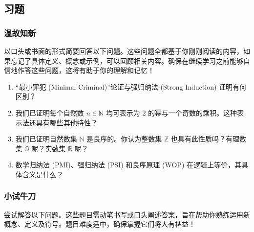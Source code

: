 \subsection{习题}

\subsubsection*{温故知新}

以口头或书面的形式简要回答以下问题。这些问题全都基于你刚刚阅读的内容，如果忘记了具体定义、概念或示例，可以回顾相关内容。确保在继续学习之前能够自信地作答这些问题，这将有助于你的理解和记忆！

\begin{enumerate}[label=(\arabic*)]
    \item ``最小罪犯 (Minimal Criminal)''论证与强归纳法 (Strong Induction) 证明有何区别？
    \item 我们已证明每个自然数 $n \in \mathbb{N}$ 均可表示为 $2$ 的幂与一个奇数的乘积。这种表示法还具有哪些其他特性？
    \item 我们已证明自然数集 $\mathbb{N}$ 是良序的。你认为整数集 $\mathbb{Z}$ 也具有此性质吗？有理数集 $\mathbb{Q}$ 呢？实数集 $\mathbb{R}$ 呢？
    \item 数学归纳法 (PMI)、强归纳法 (PSI) 和良序原理 (WOP) 在逻辑上等价，其具体含义是什么？
\end{enumerate}

\subsubsection*{小试牛刀}

尝试解答以下问题。这些题目需动笔书写或口头阐述答案，旨在帮助你熟练运用新概念、定义及符号。题目难度适中，确保掌握它们将大有裨益！

